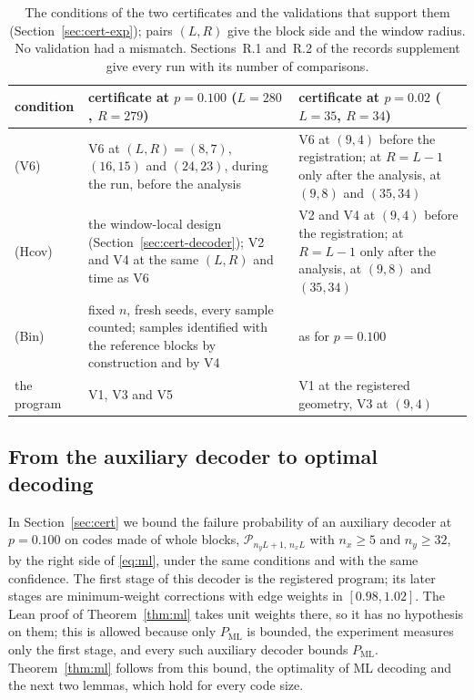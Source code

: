 \documentclass[11pt]{amsart}
\theoremstyle{definition}
\theoremstyle{remark}
\numberwithin{equation}{section}
\newcommand{\PML}{P_{\mathrm{ML}}}
\begin{document}
\begin{table}[ht]
\centering
\small
\begin{tabular}{@{}>{\raggedright\arraybackslash}p{}p{}p{}@{}}
\toprule
condition & certificate at $p=0.100$ ($L=280$, $R=279$) & certificate at $p=0.02$ ($L=35$, $R=34$) \\
\midrule
(V6) & V6 at $(L,R)=(8,7)$, $(16,15)$ and $(24,23)$, during the run, before the analysis & V6 at $(9,4)$ before the registration; at $R=L-1$ only after the analysis, at $(9,8)$ and $(35,34)$ \\
(Hcov) & the window-local design (Section~\ref{sec:cert-decoder}); V2 and V4 at the same $(L,R)$ and time as V6 & V2 and V4 at $(9,4)$ before the registration; at $R=L-1$ only after the analysis, at $(9,8)$ and $(35,34)$ \\
(Bin) & fixed $n$, fresh seeds, every sample counted; samples identified with the reference blocks by construction and by V4 & as for $p=0.100$ \\
the program & V1, V3 and V5 & V1 at the registered geometry, V3 at $(9,4)$ \\
\bottomrule
\end{tabular}
\caption{The conditions of the two certificates and the validations that support them (Section~\ref{sec:cert-exp}); pairs $(L,R)$ give the block side and the window radius. No validation had a mismatch. Sections~R.1 and~R.2 of the records supplement give every run with its number of comparisons.}
\label{tab:conditions}
\end{table}

\subsection{From the auxiliary decoder to optimal decoding}\label{sec:reduction}
In Section~\ref{sec:cert} we bound the failure probability of an auxiliary decoder at $p=0.100$ on codes made of whole blocks, $\mathcal P_{n_yL+1,\,n_xL}$ with $n_x\ge5$ and $n_y\ge32$, by the right side of \eqref{eq:ml}, under the same conditions and with the same confidence. The first stage of this decoder is the registered program; its later stages are minimum-weight corrections with edge weights in $[0.98,1.02]$. The Lean proof of Theorem~\ref{thm:ml} takes unit weights there, so it has no hypothesis on them; this is allowed because only $\PML$ is bounded, the experiment measures only the first stage, and every such auxiliary decoder bounds $\PML$. Theorem~\ref{thm:ml} follows from this bound, the optimality of ML decoding and the next two lemmas, which hold for every code size.
\end{document}
